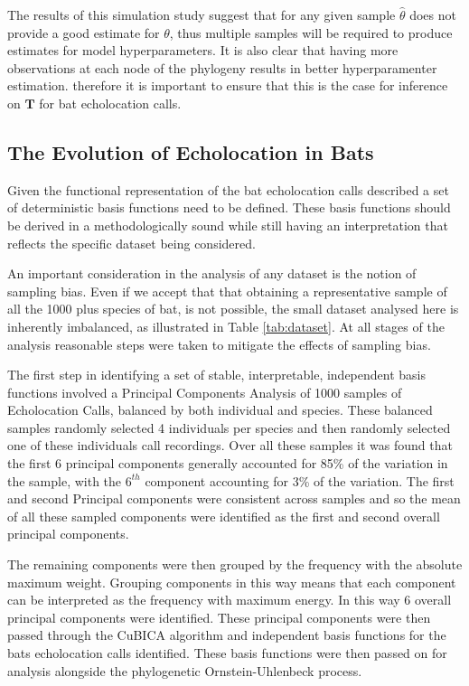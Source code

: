\documentclass[wsdraft]{ws-rv9x6} %
\begin{document}
The results of this simulation study suggest that for any given sample \(\hat{\theta}\) does not provide a good estimate for \(\theta\), thus multiple samples will be required to produce estimates for model hyperparameters. It is also clear that having more observations at each node of the phylogeny results in better hyperparamenter estimation. therefore it is important to ensure that this is the case for inference on \(\mathbf{T}\) for bat echolocation calls.  

\subsection{The Evolution of Echolocation in Bats}

Given the functional representation of the bat echolocation calls described a set of deterministic basis functions need to be defined. These basis functions should be derived in a methodologically sound while still having an interpretation that reflects the specific dataset being considered. 

An important consideration in the analysis of any dataset is the notion of sampling bias. Even if we accept that that obtaining a representative sample of all the 1000 plus species of bat, is not possible, the small dataset analysed here is inherently imbalanced, as illustrated in Table \ref{tab:dataset}. At all stages of the analysis reasonable steps were taken to mitigate the effects of sampling bias.

The first step in identifying a set of stable, interpretable, independent basis functions involved a Principal Components Analysis of 1000 samples of Echolocation Calls, balanced by both individual and species. These balanced samples randomly selected 4 individuals per species and then  randomly selected one of these individuals call recordings. Over all these samples it was found that the first 6 principal components generally accounted for 85\% of the variation in the sample, with the \(6^{th}\) component accounting for 3\% of the variation. The first and second Principal components were consistent across samples and so the mean of all these sampled components were identified as the first and second overall principal components. 

The remaining components were then grouped by the frequency with the absolute maximum weight. Grouping components in this way means that each component can be interpreted as the frequency with maximum energy.
In this way 6 overall principal components were identified. These principal components were then passed through the CuBICA algorithm and independent basis functions for the bats echolocation calls identified. These basis functions were then passed on for analysis alongside the phylogenetic Ornstein-Uhlenbeck process.
\end{document}
